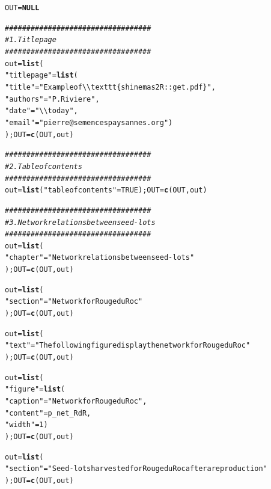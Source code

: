 \documentclass{article}\usepackage[]{graphicx}\usepackage[]{color}
\makeatletter
\newcommand{\hlnum}[1]{\textcolor[rgb]{0.686,0.059,0.569}{#1}}%
\newcommand{\hlstr}[1]{\textcolor[rgb]{0.192,0.494,0.8}{#1}}%
\newcommand{\hlcom}[1]{\textcolor[rgb]{0.678,0.584,0.686}{\textit{#1}}}%
\newcommand{\hlstd}[1]{\textcolor[rgb]{0.345,0.345,0.345}{#1}}%
\newcommand{\hlkwa}[1]{\textcolor[rgb]{0.161,0.373,0.58}{\textbf{#1}}}%
\newcommand{\hlkwb}[1]{\textcolor[rgb]{0.69,0.353,0.396}{#1}}%
\newcommand{\hlkwd}[1]{\textcolor[rgb]{0.737,0.353,0.396}{\textbf{#1}}}%
\newenvironment{kframe}{%
 \def\at@end@of@kframe{}%
 \ifinner\ifhmode%
  \def\at@end@of@kframe{\end{minipage}}%
  \begin{minipage}{\columnwidth}%
 \fi\fi%
 \def\FrameCommand##1{\hskip\@totalleftmargin \hskip-\fboxsep
 \colorbox{shadecolor}{##1}\hskip-\fboxsep
     \hskip-\linewidth \hskip-\@totalleftmargin \hskip\columnwidth}%
 \MakeFramed {\advance\hsize-\width
   \@totalleftmargin\z@ \linewidth\hsize
   \@setminipage}}%
 {\par\unskip\endMakeFramed%
 \at@end@of@kframe}
\newenvironment{knitrout}{}{} %
\makeatother
\begin{document}
\begin{knitrout}
\color{fgcolor}\begin{kframe}
\begin{alltt}
\hlstd{OUT} \hlkwb{=} \hlkwa{NULL}

\hlcom{##################################}
\hlcom{# 1. Title page }
\hlcom{##################################}
\hlstd{out} \hlkwb{=} \hlkwd{list}\hlstd{(}
        \hlstr{"titlepage"} \hlstd{=} \hlkwd{list}\hlstd{(}
                \hlstr{"title"} \hlstd{=} \hlstr{"Example of \textbackslash{}\textbackslash{}texttt\{shinemas2R::get.pdf\}"}\hlstd{,}
                \hlstr{"authors"} \hlstd{=} \hlstr{"P. Riviere"}\hlstd{,}
                \hlstr{"date"} \hlstd{=} \hlstr{"\textbackslash{}\textbackslash{}today"}\hlstd{,}
                \hlstr{"email"} \hlstd{=} \hlstr{"pierre@semencespaysannes.org"}\hlstd{)}
        \hlstd{); OUT} \hlkwb{=} \hlkwd{c}\hlstd{(OUT, out)}


\hlcom{##################################}
\hlcom{# 2. Table of contents}
\hlcom{##################################}
\hlstd{out} \hlkwb{=} \hlkwd{list}\hlstd{(}\hlstr{"tableofcontents"} \hlstd{=} \hlnum{TRUE}\hlstd{); OUT} \hlkwb{=} \hlkwd{c}\hlstd{(OUT, out)}


\hlcom{##################################}
\hlcom{# 3. Network relations between seed-lots}
\hlcom{##################################}
\hlstd{out} \hlkwb{=} \hlkwd{list}\hlstd{(}
        \hlstr{"chapter"} \hlstd{=} \hlstr{"Network relations between seed-lots"}
        \hlstd{); OUT} \hlkwb{=} \hlkwd{c}\hlstd{(OUT, out)}

\hlstd{out} \hlkwb{=} \hlkwd{list}\hlstd{(}
        \hlstr{"section"} \hlstd{=} \hlstr{"Network for Rouge du Roc"}
        \hlstd{); OUT} \hlkwb{=} \hlkwd{c}\hlstd{(OUT, out)}

\hlstd{out} \hlkwb{=} \hlkwd{list}\hlstd{(}
        \hlstr{"text"} \hlstd{=} \hlstr{"The following figure display the network for Rouge du Roc"}
        \hlstd{); OUT} \hlkwb{=} \hlkwd{c}\hlstd{(OUT, out)}

\hlstd{out} \hlkwb{=} \hlkwd{list}\hlstd{(}
        \hlstr{"figure"} \hlstd{=} \hlkwd{list}\hlstd{(}
                \hlstr{"caption"} \hlstd{=} \hlstr{"Network for Rouge du Roc"}\hlstd{,}
                \hlstr{"content"} \hlstd{= p_net_RdR,}
                \hlstr{"width"} \hlstd{=} \hlnum{1}\hlstd{)}
        \hlstd{); OUT} \hlkwb{=} \hlkwd{c}\hlstd{(OUT, out)}

\hlstd{out} \hlkwb{=} \hlkwd{list}\hlstd{(}
        \hlstr{"section"} \hlstd{=} \hlstr{"Seed-lots harvested for Rouge du Roc after a reproduction"}
        \hlstd{); OUT} \hlkwb{=} \hlkwd{c}\hlstd{(OUT, out)}


\end{alltt}
\end{kframe}
\end{knitrout}
\end{document}
